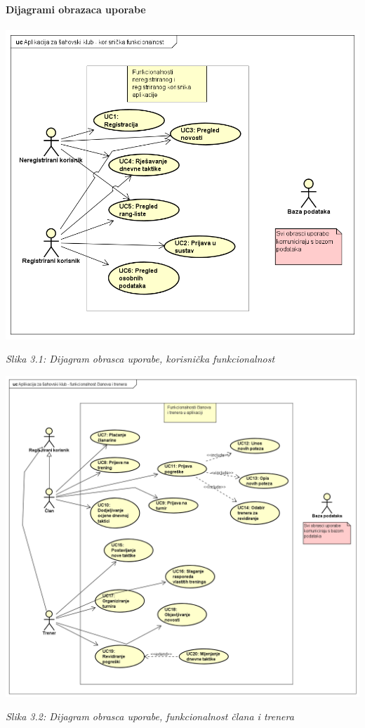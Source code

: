 \documentclass{article}
\begin{document}
		\eject
		
		\textbf{Dijagrami obrazaca uporabe}\\\\
		\includegraphics[width=\columnwidth]{korisnik_uc_dijagram}
		\begin{center}
			\textit{Slika 3.1: Dijagram obrasca uporabe, korisnička funkcionalnost}
		\end{center}
		\eject
		
		\includegraphics[width=\columnwidth]{clanovi_i_treneri_uc_dijagram}
		\begin{center}
			\textit{Slika 3.2: Dijagram obrasca uporabe, funkcionalnost člana i trenera}
		\end{center}
		\eject
		
\end{document}
